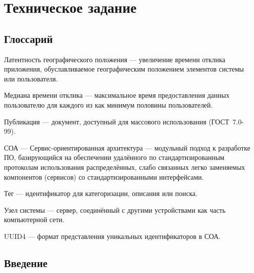 \documentclass{bmstu-gost-7-32}
\begin{document}
\chapter*{Техническое задание}

\section*{Глоссарий}

Латентность географического положения — увеличение времени отклика приложения, обуславливаемое географическим положением элементов системы или пользователя.

Медиана времени отклика — максимальное время предоставления данных пользователю для каждого из как минимум половины пользователей.

Публикация — документ, доступный для массового использования (ГОСТ~7.0-99).

СОА — Сервис-ориентированная архитектура — модульный подход к разработке ПО, базирующийся на обеспечении удалённого по стандартизированным протоколам использования распределённых, слабо связанных легко заменяемых компонентов (сервисов) со стандартизированными интерфейсами.

Тег — идентификатор для категоризации, описания или поиска.

Узел системы — сервер, соединённый с другими устройствами как часть компьютерной сети.

UUID4 — формат представления уникальных идентификаторов в СОА.


\section{Введение}


\end{document}
